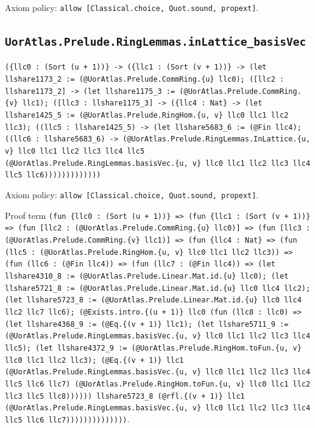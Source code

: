 \documentclass[11pt]{article}
\begin{document}
\noindent Axiom policy: \texttt{allow [Classical.choice, Quot.sound, propext]}.\par
\subsection*{\texttt{UorAtlas.Prelude.RingLemmas.inLattice\_basisVec}}
\noindent\texttt{(\{llc0 : (Sort (u + 1))\} -> (\{llc1 : (Sort (v + 1))\} -> (let llshare1173\_2 := (@UorAtlas.Prelude.CommRing.\{u\} llc0); ([llc2 : llshare1173\_2] -> (let llshare1175\_3 := (@UorAtlas.Prelude.CommRing.\{v\} llc1); ([llc3 : llshare1175\_3] -> (\{llc4 : Nat\} -> (let llshare1425\_5 := (@UorAtlas.Prelude.RingHom.\{u, v\} llc0 llc1 llc2 llc3); ((llc5 : llshare1425\_5) -> (let llshare5683\_6 := (@Fin llc4); ((llc6 : llshare5683\_6) -> (@UorAtlas.Prelude.RingLemmas.InLattice.\{u, v\} llc0 llc1 llc2 llc3 llc4 llc5 (@UorAtlas.Prelude.RingLemmas.basisVec.\{u, v\} llc0 llc1 llc2 llc3 llc4 llc5 llc6)))))))))))))}\par
\noindent Axiom policy: \texttt{allow [Classical.choice, Quot.sound, propext]}.\par
\noindent Proof term \texttt{(fun \{llc0 : (Sort (u + 1))\} => (fun \{llc1 : (Sort (v + 1))\} => (fun [llc2 : (@UorAtlas.Prelude.CommRing.\{u\} llc0)] => (fun [llc3 : (@UorAtlas.Prelude.CommRing.\{v\} llc1)] => (fun \{llc4 : Nat\} => (fun (llc5 : (@UorAtlas.Prelude.RingHom.\{u, v\} llc0 llc1 llc2 llc3)) => (fun (llc6 : (@Fin llc4)) => (fun (llc7 : (@Fin llc4)) => (let llshare4310\_8 := (@UorAtlas.Prelude.Linear.Mat.id.\{u\} llc0); (let llshare5721\_8 := (@UorAtlas.Prelude.Linear.Mat.id.\{u\} llc0 llc4 llc2); (let llshare5723\_8 := (@UorAtlas.Prelude.Linear.Mat.id.\{u\} llc0 llc4 llc2 llc7 llc6); (@Exists.intro.\{(u + 1)\} llc0 (fun (llc8 : llc0) => (let llshare4368\_9 := (@Eq.\{(v + 1)\} llc1); (let llshare5711\_9 := (@UorAtlas.Prelude.RingLemmas.basisVec.\{u, v\} llc0 llc1 llc2 llc3 llc4 llc5); (let llshare4372\_9 := (@UorAtlas.Prelude.RingHom.toFun.\{u, v\} llc0 llc1 llc2 llc3); (@Eq.\{(v + 1)\} llc1 (@UorAtlas.Prelude.RingLemmas.basisVec.\{u, v\} llc0 llc1 llc2 llc3 llc4 llc5 llc6 llc7) (@UorAtlas.Prelude.RingHom.toFun.\{u, v\} llc0 llc1 llc2 llc3 llc5 llc8)))))) llshare5723\_8 (@rfl.\{(v + 1)\} llc1 (@UorAtlas.Prelude.RingLemmas.basisVec.\{u, v\} llc0 llc1 llc2 llc3 llc4 llc5 llc6 llc7))))))))))))))}.\par
\end{document}
